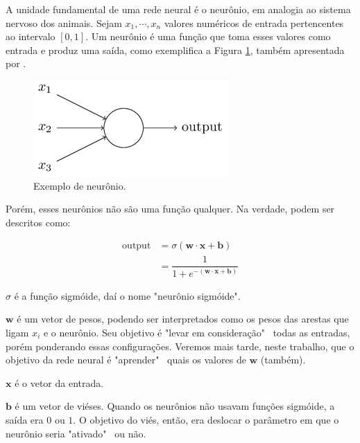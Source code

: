 \documentclass{article}
\begin{document}
            A unidade fundamental de uma rede neural é o neurônio, em analogia ao sistema nervoso dos animais.
            Sejam $x_1, \cdots, x_n$ valores numéricos de entrada pertencentes ao intervalo $[0, 1]$.
            Um neurônio é uma função que toma esses valores como entrada e produz uma saída, como exemplifica a Figura \ref{fig2}, também apresentada por \cite{nielsen2015neural}.

            \begin{figure}[h!]
                \centering
                \includegraphics[scale=0.5]{Images/Sigmoid neuron.png}
                \caption{Exemplo de neurônio.}
                \label{fig2}
            \end{figure}
            
            Porém, esses neurônios não são uma função qualquer. Na verdade, podem ser descritos como:

            \begin{equation}
                \begin{split}
                    \textrm{output} &= \sigma(\mathbf{w} \cdot \mathbf{x} + \mathbf{b}) \\
                                    &= \dfrac{1}{1 + e^{-(\mathbf{w} \cdot \mathbf{x} + \mathbf{b})}}
                \end{split}
            \end{equation}

            $\sigma$ é a função sigmóide, daí o nome "neurônio sigmóide".

            $\mathbf{w}$ é um vetor de pesos, podendo ser interpretados como os pesos das arestas que ligam $x_i$ e o neurônio.
            Seu objetivo é "levar em consideração" \ todas as entradas, porém ponderando essas configurações.
            Veremos mais tarde, neste trabalho, que o objetivo da rede neural é "aprender" \ quais os valores de $\mathbf{w}$ (também).

            $\mathbf{x}$ é o vetor da entrada.
            
            $\mathbf{b}$ é um vetor de viéses.
            Quando os neurônios não usavam funções sigmóide, a saída era $0$ ou $1$.
            O objetivo do viés, então, era deslocar o parâmetro em que o neurônio seria "ativado" \ ou não.
\end{document}
